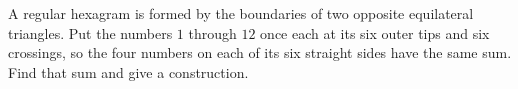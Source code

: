 A regular hexagram is formed by the boundaries of two opposite equilateral triangles. Put the numbers $1$ through $12$ once each at its six outer tips and six crossings, so the four numbers on each of its six straight sides have the same sum. Find that sum and give a construction.
